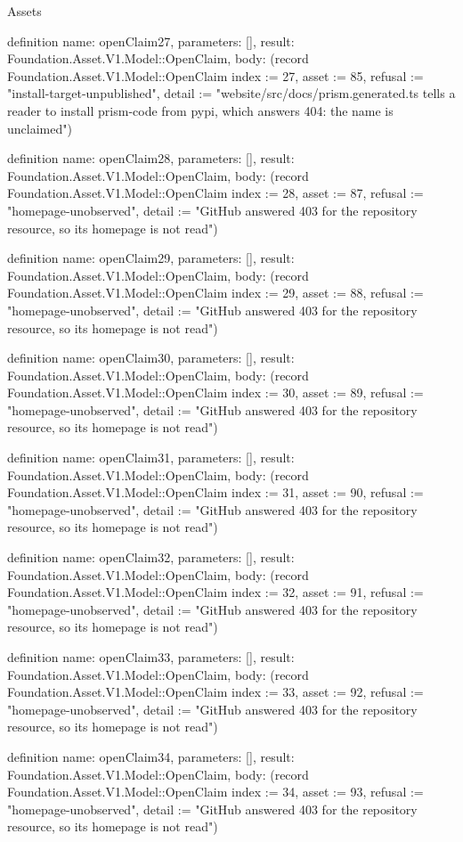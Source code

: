 \begin{lexlean}{Assets}
\begin{semanticmodule}
definition{
  name: openClaim27,
  parameters: [],
  result: Foundation.Asset.V1.Model::OpenClaim,
  body: (record Foundation.Asset.V1.Model::OpenClaim {index := 27, asset := 85, refusal := "install-target-unpublished", detail := "website/src/docs/prism.generated.ts tells a reader to install prism-code from pypi, which answers 404: the name is unclaimed"})
}

definition{
  name: openClaim28,
  parameters: [],
  result: Foundation.Asset.V1.Model::OpenClaim,
  body: (record Foundation.Asset.V1.Model::OpenClaim {index := 28, asset := 87, refusal := "homepage-unobserved", detail := "GitHub answered 403 for the repository resource, so its homepage is not read"})
}

definition{
  name: openClaim29,
  parameters: [],
  result: Foundation.Asset.V1.Model::OpenClaim,
  body: (record Foundation.Asset.V1.Model::OpenClaim {index := 29, asset := 88, refusal := "homepage-unobserved", detail := "GitHub answered 403 for the repository resource, so its homepage is not read"})
}

definition{
  name: openClaim30,
  parameters: [],
  result: Foundation.Asset.V1.Model::OpenClaim,
  body: (record Foundation.Asset.V1.Model::OpenClaim {index := 30, asset := 89, refusal := "homepage-unobserved", detail := "GitHub answered 403 for the repository resource, so its homepage is not read"})
}

definition{
  name: openClaim31,
  parameters: [],
  result: Foundation.Asset.V1.Model::OpenClaim,
  body: (record Foundation.Asset.V1.Model::OpenClaim {index := 31, asset := 90, refusal := "homepage-unobserved", detail := "GitHub answered 403 for the repository resource, so its homepage is not read"})
}

definition{
  name: openClaim32,
  parameters: [],
  result: Foundation.Asset.V1.Model::OpenClaim,
  body: (record Foundation.Asset.V1.Model::OpenClaim {index := 32, asset := 91, refusal := "homepage-unobserved", detail := "GitHub answered 403 for the repository resource, so its homepage is not read"})
}

definition{
  name: openClaim33,
  parameters: [],
  result: Foundation.Asset.V1.Model::OpenClaim,
  body: (record Foundation.Asset.V1.Model::OpenClaim {index := 33, asset := 92, refusal := "homepage-unobserved", detail := "GitHub answered 403 for the repository resource, so its homepage is not read"})
}

definition{
  name: openClaim34,
  parameters: [],
  result: Foundation.Asset.V1.Model::OpenClaim,
  body: (record Foundation.Asset.V1.Model::OpenClaim {index := 34, asset := 93, refusal := "homepage-unobserved", detail := "GitHub answered 403 for the repository resource, so its homepage is not read"})
}


\end{semanticmodule}
\end{lexlean}
